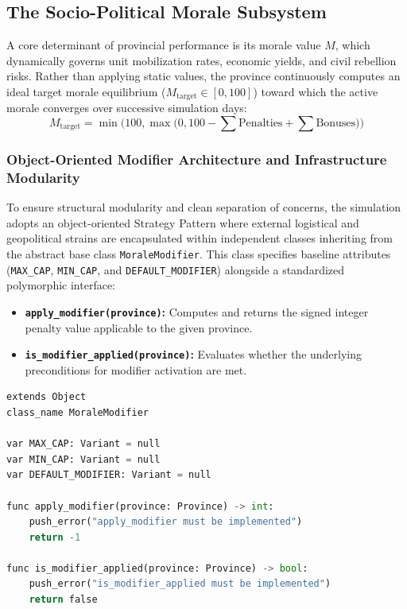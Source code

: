 \subsection{The Socio-Political Morale Subsystem}
\label{subsec:morale_subsystem}

A core determinant of provincial performance is its morale value $M$, which dynamically governs unit mobilization rates, economic yields, and civil rebellion risks. Rather than applying static values, the province continuously computes an ideal target morale equilibrium ($M_{\text{target}} \in [0, 100]$) toward which the active morale converges over successive simulation days:
\begin{equation}
    M_{\text{target}} = \min\Big(100, \max\big(0, 100 - \sum \text{Penalties} + \sum \text{Bonuses}\big)\Big)
\end{equation}

\subsubsection{Object-Oriented Modifier Architecture and Infrastructure Modularity}
To ensure structural modularity and clean separation of concerns, the simulation adopts an object-oriented Strategy Pattern where external logistical and geopolitical strains are encapsulated within independent classes inheriting from the abstract base class \texttt{MoraleModifier}. This class specifies baseline attributes (\texttt{MAX\_CAP}, \texttt{MIN\_CAP}, and \texttt{DEFAULT\_MODIFIER}) alongside a standardized polymorphic interface:
\begin{itemize}
    \item \textbf{\texttt{apply\_modifier(province)}:} Computes and returns the signed integer penalty value applicable to the given province.
    \item \textbf{\texttt{is\_modifier\_applied(province)}:} Evaluates whether the underlying preconditions for modifier activation are met.
\end{itemize}

\begin{lstlisting}[language=python, caption={Abstract MoraleModifier interface in GDScript.}, label={lst:morale_modifier_base}]
extends Object
class_name MoraleModifier

var MAX_CAP: Variant = null
var MIN_CAP: Variant = null
var DEFAULT_MODIFIER: Variant = null

func apply_modifier(province: Province) -> int:
    push_error("apply_modifier must be implemented")
    return -1

func is_modifier_applied(province: Province) -> bool:
    push_error("is_modifier_applied must be implemented")
    return false
\end{lstlisting}


